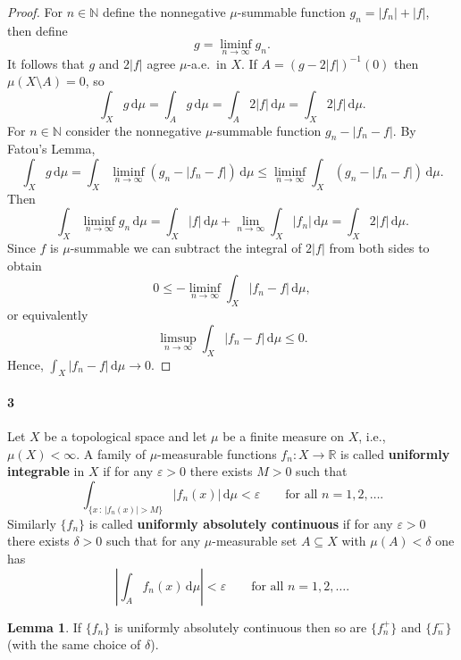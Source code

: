 \documentclass[12pt]{article}
\newlength{\myparskip}
\newenvironment{fullbox}{\begin{lrbox}{\savefullbox}\begin{minipage}{\dimexpr\textwidth-2\fboxsep\relax}\setlength{\parskip}{\myparskip}}{\end{minipage}\end{lrbox}\framebox[\textwidth]{\usebox{\savefullbox}}}
\newenvironment{pbox}[1][]{\begin{fullbox}\ifx#1\empty\else\paragraph{#1}\phantom{}\fi}{\end{fullbox}}
\theoremstyle{definition}
\newtheorem{lemma}{Lemma}
\newcommand{\N}{\mathbb{N}}
\newcommand{\R}{\mathbb{R}}
\newcommand{\eps}{\varepsilon}
\newcommand{\<}{\langle}
\renewcommand{\>}{\rangle}
\newcommand{\dd}{\,\mathrm{d}}
\newcommand{\abs}[1]{\left|#1\right|}
\begin{document}
\begin{proof}
    For $n \in \N$ define the nonnegative $\mu$-summable function $g_n = |f_n| + |f|$, then define
    \[
        g = \liminf_{n \to \infty} g_n.
    \]
    It follows that $g$ and $2|f|$ agree $\mu$-a.e.\ in $X$.
    If $A = (g - 2|f|)^{-1}(0)$ then $\mu(X \setminus A) = 0$, so
    \[
        \int_X g \dd\mu
            = \int_A g \dd\mu
            = \int_A 2|f| \dd\mu
            = \int_X 2|f| \dd\mu.
    \]
    For $n \in \N$ consider the nonnegative $\mu$-summable function $g_n - |f_n - f|$.
    By Fatou's Lemma,
    \[
        \int_X g \dd\mu 
        = \int_X \liminf_{n \to \infty} (g_n - |f_n - f|) \dd\mu
            \leq \liminf_{n \to \infty} \int_X (g_n - |f_n - f|) \dd\mu.
    \]
    Then
    \[
        \int_X \liminf_{n \to \infty} g_n \dd\mu
            = \int_X |f| \dd\mu + \lim_{n \to \infty} \int_X |f_n| \dd\mu
            = \int_X 2|f| \dd\mu.
    \]
    Since $f$ is $\mu$-summable we can subtract the integral of $2|f|$ from both sides to obtain
    \[
        0 \leq -\liminf_{n \to \infty} \int_X |f_n - f| \dd\mu,
    \]
    or equivalently
    \[
        \limsup_{n \to \infty} \int_X |f_n - f| \dd\mu \leq 0.
    \]
    Hence, $\int_X |f_n - f| \dd\mu \to 0$.
\end{proof}

\newpage
\begin{pbox}[3]
    Let $X$ be a topological space and let $\mu$ be a finite measure on $X$, i.e., $\mu(X) < \infty$.
    A family of $\mu$-measurable functions $f_n : X \to \R$ is called \textbf{uniformly integrable} in $X$ if for any $\eps > 0$ there exists $M > 0$ such that
    \[
        \int_{\{x \,:\, |f_n(x)| > M\}} |f_n(x)| \dd\mu < \eps \qquad\text{for all } n = 1, 2, \dots.
    \]
    Similarly $\{f_n\}$ is called \textbf{uniformly absolutely continuous} if for any $\eps > 0$ there exists $\delta > 0$ such that for any $\mu$-measurable set $A \subseteq X$ with $\mu(A) < \delta$ one has
    \[
        \abs{\int_A f_n(x) \dd\mu} < \eps \qquad\text{for all } n = 1, 2, \dots.
    \]
\end{pbox}

\begin{lemma}
    If $\{f_n\}$ is uniformly absolutely continuous then so are $\{f_n^+\}$ and $\{f_n^-\}$ (with the same choice of $\delta$).
\end{lemma}
\end{document}
